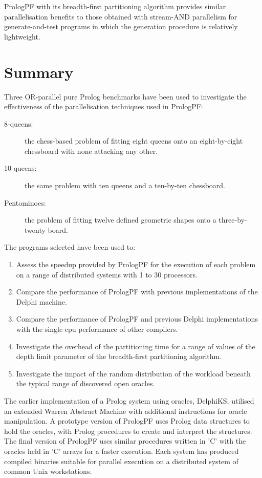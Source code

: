 PrologPF with its breadth-first partitioning algorithm provides similar parallelisation
benefits to those obtained with stream-AND parallelism for
generate-and-test programs in which the
generation procedure is relatively lightweight.

\section{Summary} %

Three OR-parallel pure Prolog benchmarks have been used to 
investigate the effectiveness of the parallelisation techniques used in PrologPF:
\begin{description}
\item[8-queens: ]{the chess-based problem of fitting eight queens onto an
  eight-by-eight chessboard with none attacking any other.}
\item[10-queens: ]{the same problem with ten queens and a ten-by-ten chessboard.}
\item[Pentominoes: ]{the problem of fitting twelve defined geometric shapes onto
  a three-by-twenty board.}
\end{description}
The programs selected have been used to:
\begin{enumerate}
\item{Assess the speedup provided by PrologPF for the execution of each problem on
  a range of distributed systems with 1 to 30 processors.}
\item{Compare the performance of PrologPF with previous implementations of the
  Delphi machine.}
\item{Compare the performance of PrologPF and previous Delphi implementations with
  the single-cpu performance of other compilers.}
\item{Investigate the overhead of the partitioning time for a range of values of
  the depth limit parameter of the breadth-first partitioning algorithm.}
\item{Investigate the impact of the random distribution of the workload beneath the
  typical range of discovered open oracles.}
\end{enumerate}

The earlier implementation of a Prolog system using oracles, DelphiKS, utilised
an extended Warren Abstract Machine \cite{War83} with additional instructions for
oracle manipulation.  A prototype version of PrologPF uses Prolog data structures
to hold the oracles, with Prolog procedures to create and interpret the
structures.  The final version of PrologPF uses similar procedures written in 'C'
with the oracles held in 'C' arrays for a faster execution.  Each system has produced
compiled binaries suitable for parallel execution on a distributed system of common Unix
workstations.

